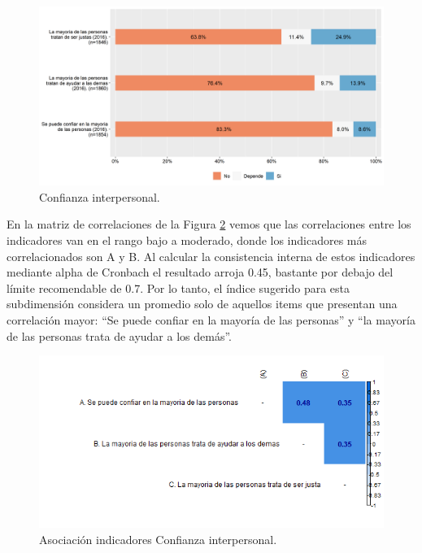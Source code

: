 \documentclass[
  12pt,
]{book}
\begin{document}
\begin{figure}[H]

{\centering \includegraphics[width=1\linewidth,height=1\textheight]{output/graphs/confianza-interpersonal} 

}

\caption{Confianza interpersonal.}\label{fig:confianza-interpersonal}
\end{figure}

En la matriz de correlaciones de la Figura \ref{fig:confianza-interpersonal-cor} vemos que las correlaciones entre los indicadores van en el rango bajo a moderado, donde los indicadores más correlacionados son A y B. Al calcular la consistencia interna de estos indicadores mediante alpha de Cronbach el resultado arroja 0.45, bastante por debajo del límite recomendable de 0.7. Por lo tanto, el índice sugerido para esta subdimensión considera un promedio solo de aquellos items que presentan una correlación mayor: ``Se puede confiar en la mayoría de las personas'' y ``la mayoría de las personas trata de ayudar a los demás''.

\begin{figure}[H]

{\centering \includegraphics[width=1\linewidth,height=1\textheight]{output/graphs/confianza-interpersonal_cor} 

}

\caption{Asociación indicadores Confianza interpersonal.}\label{fig:confianza-interpersonal-cor}
\end{figure}
\end{document}
